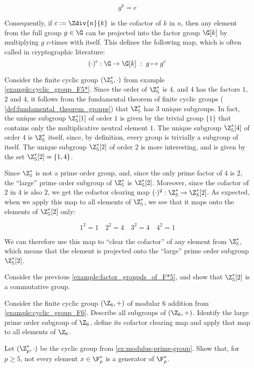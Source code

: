 \begin{equation}
g^k = e
\end{equation}

Consequently, if $c:=\Zdiv{n}{k}$ is the cofactor of $k$ in $n$, then any element from the full group $g\in \G$ can be projected into the factor group $\G[k]$ by multiplying $g$ $c$-times with itself. This defines the following map, which is often called  in cryptographic literature:
\begin{equation}
\label{def:cofactor_clearing}
(\cdot)^c: \G \to \G[k]\; : \; g \mapsto g^c
\end{equation}

\begin{example}\label{example:factor_groupds_of_F*5} Consider the finite cyclic group $(\Z_5^*,\cdot)$ from example \ref{example:cyclic_group_F5*}. Since the order of $\Z^*_5$ is $4$, and $4$ has the factors $1$, $2$ and $4$, it follows from the fundamental theorem of finite cyclic groups ( \ref{def:fundamental_theorem_groups}) that $\Z^*_5$ has $3$ unique subgroups. In fact, the unique subgroup $\Z^*_5[1]$ of order $1$ is given by the trivial group $\{1\}$ that contains only the multiplicative neutral element $1$. The unique subgroup $\Z^*_5[4]$ of order $4$ is $\Z^*_5$ itself, since, by definition, every group is trivially a subgroup of itself. The unique subgroup $\Z^*_5[2]$ of order $2$ is more interesting, and is given by the set $\Z^*_5[2]=\{1,4\}$.

Since $\Z^*_5$ is not a prime order group, and, since the only prime factor of $4$ is $2$, the ``large'' prime order subgroup of $\Z^*_5$ is $\Z^*_5[2]$. Moreover, since the cofactor of $2$ in $4$ is also $2$, we get the cofactor clearing map $(\cdot)^2:\Z^*_5 \to \Z^*_5[2]$.  As expected, when we apply this map to all elements of $\Z^*_5$, we see that it maps onto the elements of $\Z^*_5[2]$ only:

\begin{equation}
1^2 = 1\quad{}  2^2 = 4\quad{}  3^2 = 4\quad{}  4^2 = 1
\end{equation}

We can therefore use this map to ``clear the cofactor'' of any element from $\Z^*_5$, which means that the element is projected onto the ``large'' prime order subgroup $\Z^*_5[2]$.
\end{example}
\begin{exercise}Consider the previous \examplename{} \ref{example:factor_groupds_of_F*5}, and show that $\Z^*_5[2]$ is a commutative group.
\end{exercise}
\begin{exercise}
Consider the finite cyclic group $(\Z_6,+)$ of modular 6 addition from \examplename{} \ref{example:cyclic_group_F6}. Describe all subgroups of $(\Z_6,+)$. Identify the large prime order subgroup of $\Z_6$, define its cofactor clearing map and apply that map to all elements of $\Z_6$.
\end{exercise}
\begin{exercise}Let $(\Z_p^*,\cdot)$ be the cyclic group from \exercisename{} \ref{ex:modulus-prime-group}. Show that, for $p\geq 5$, not every element $x\in \F_p^*$ is a generator of $\F_p^*$.
\end{exercise}
